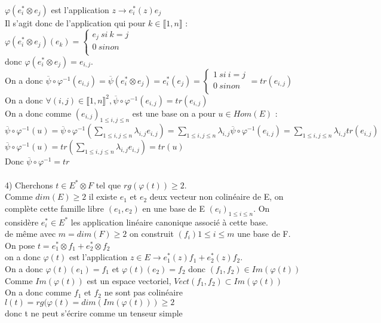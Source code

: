 \documentclass{article}
\begin{document}
$\varphi(e^\ast_i \otimes e_{j})$  est l'application $z \rightarrow e^*_i(z)e_j$ \\
Il s'agit donc de l'application qui pour $k\in \llbracket1,n\rrbracket$ : \\
$\varphi(e^\ast_i \otimes e_{j})(e_k)=\begin{cases}
e_j \ si \ k=j \\
0 \ sinon \\
\end{cases}$ \\
donc $\varphi(e^\ast_i \otimes e_{j})= e_{i,j}$. \\
On a donc $\overline{\psi} \circ \varphi^{-1}(e_{i,j})= \overline{\psi}(e^\ast_i \otimes e_{j})=e^*_i(e_j)=\begin{cases}
1 \ si \ i=j \\
0 \ sinon \\
\end{cases}=tr(e_{i,j})$ \\
On a donc $\forall (i,j) \in \llbracket1,n\rrbracket^2,\overline{\psi} \circ \varphi^{-1}(e_{i,j})=tr(e_{i,j})$ \\
On a donc comme $(e_{i,j})_{ 1 \leq i,j \leq n}$ est une base on a pour $u \in Hom(E)$ : \\
$\overline{\psi} \circ \varphi^{-1}(u)=\overline{\psi} \circ \varphi^{-1}(\sum_{ 1 \leq i,j\leq n} \lambda_{i,j} e_{i,j})=\sum_{ 1 \leq i,j\leq n} \lambda_{i,j}\overline{\psi} \circ \varphi^{-1}(e_{i,j})=\sum_{ 1 \leq i,j\leq n}\lambda_{i,j} tr(e_{i,j})$ \\
$\overline{\psi} \circ \varphi^{-1}(u)= tr(\sum_{ 1 \leq i,j\leq n}\lambda_{i,j} e_{i,j})=tr(u)$ \\
Donc $\overline{\psi} \circ \varphi^{-1}=tr$ \\
\\
4) Cherchons $t\in E^* \otimes F$ tel que $rg(\varphi(t))\geq 2$. \\
Comme $dim(E)\geq 2$ il existe $e_1$ et $e_2$ deux vecteur non colinéaire de E, on complète cette famille libre $(e_1,e_2)$ en une base de E $(e_i)_{1\leq i \leq n}$. On considère $e^*_i \in E^*$ les application linéaire canonique associé à cette base. \\
de même avec $m=dim(F) \geq 2$ on construit $(f_i){1\leq i \leq m}$ une base de F. \\
On pose $t=e^*_1 \otimes f_1 + e^*_2 \otimes f_2$ \\
on a donc $\varphi(t)$ est l'application $z \in E \rightarrow e^*_1(z) f_1 + e^*_2(z) f_2$. \\
On a donc $\varphi(t)(e_1)=f_1$ et $\varphi(t)(e_2)=f_2$ donc $(f_1,f_2) \in Im(\varphi(t))$ \\
Comme $Im(\varphi(t))$ est un espace vectoriel, $Vect(f_1,f_2) \subset Im(\varphi(t))$ \\
On a donc comme $f_1$ et $f_2$ ne sont pas colinéaire $l(t)=rg(\varphi(t)=dim(Im(\varphi(t))) \geq 2$ \\
donc t ne peut s'écrire comme un tenseur simple
\end{document}
